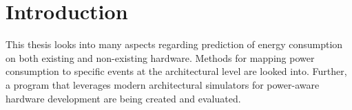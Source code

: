 \chapter{Introduction}

This thesis looks into many aspects regarding prediction of energy consumption
on both existing and non-existing hardware. Methods for mapping power
consumption to specific events at the architectural level are looked into.
Further, a program that leverages modern architectural simulators for
power-aware hardware development are being created and evaluated.





